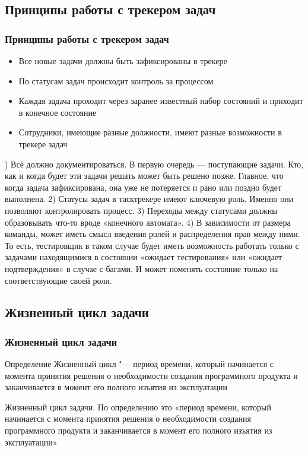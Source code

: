 \documentclass{../industrial-development}
\begin{document}
\subsection{Принципы работы с трекером задач}

\begin{frame} \frametitle{Принципы работы с трекером задач}
	\begin{itemize}
		\item Все новые задачи должны быть зафиксированы в трекере
		\item По статусам задач происходит контроль за процессом
		\item Каждая задача проходит через заранее известный набор состояний и приходит в конечное состояние
		\item Сотрудники, имеющие разные должности, имеют разные возможности в трекере задач
	\end{itemize}
\end{frame}

) Всё должно документироваться. В первую очередь — поступающие задачи. Кто, как и когда будет эти задачи решать может быть решено позже. Главное, что когда задача зафиксирована, она уже не потеряется и рано или поздно будет выполнена.
2) Статусы задач в тасктрекере имеют ключевую роль. Именно они позволяют контролировать процесс.
3) Переходы между статусами должны образовывать что-то вроде «конечного автомата».
4) В зависимости от размера команды, может иметь смысл введения ролей и распределения прав между ними. То есть, тестировщик в таком случае будет иметь возможность работать только с задачами находящимися в состоянии «ожидает тестирования» или «ожидает подтверждения» в случае с багами. И может поменять состояние только на соответствующие своей роли.

\subsection{Жизненный цикл задачи}

\begin{frame} \frametitle{Жизненный цикл задачи}
\begin{block}{Определение}
    Жизненный цикл "--- период времени, который начинается с момента принятия решения о необходимости создания программного продукта и заканчивается в момент его полного изъятия из эксплуатации
  \end{block}
\end{frame}

\lecturenotes
Жизненный цикл задачи. По определению это «период времени, который начинается с момента принятия решения о необходимости создания программного продукта и заканчивается в момент его полного изъятия из эксплуатации»
\end{document}
